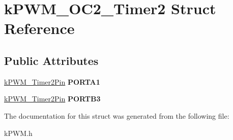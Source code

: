 \hypertarget{structkPWM__OC2__Timer2}{}\section{k\+P\+W\+M\+\_\+\+O\+C2\+\_\+\+Timer2 Struct Reference}
\label{structkPWM__OC2__Timer2}
\subsection*{Public Attributes}
\begin{DoxyCompactItemize}
\item 
\hyperlink{structkPWM__Timer2Pin}{k\+P\+W\+M\+\_\+\+Timer2\+Pin} {\bfseries P\+O\+R\+T\+A1}\hypertarget{structkPWM__OC2__Timer2_a284fd7ae8115124417293dc4713b4605}{}\label{structkPWM__OC2__Timer2_a284fd7ae8115124417293dc4713b4605}

\item 
\hyperlink{structkPWM__Timer2Pin}{k\+P\+W\+M\+\_\+\+Timer2\+Pin} {\bfseries P\+O\+R\+T\+B3}\hypertarget{structkPWM__OC2__Timer2_a1a9b06502c906ee5c5a78312452937e5}{}\label{structkPWM__OC2__Timer2_a1a9b06502c906ee5c5a78312452937e5}

\end{DoxyCompactItemize}


The documentation for this struct was generated from the following file\+:\begin{DoxyCompactItemize}
\item 
k\+P\+W\+M.\+h\end{DoxyCompactItemize}
